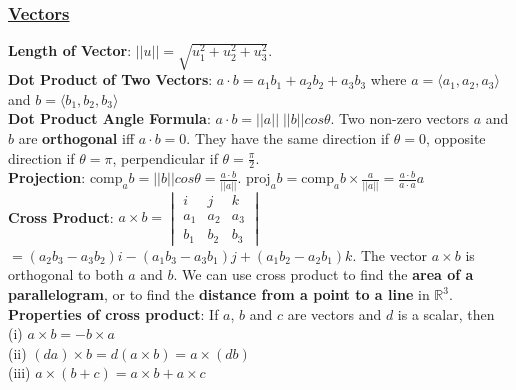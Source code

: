 \documentclass{article}
\begin{document}
\singlespacing

\titlespacing*{\subsubsection}{0pt}{0pt}{0pt}

\pagestyle{fancy}
\fancyhf{}
\renewcommand{\headrulewidth}{0pt}

\begin{multicols*}{3}

\subsubsection*{\underline{Vectors}}
\textbf{Length of Vector}: $||u||=\sqrt{u_1^2+u_2^2+u_3^2}$.\\
\textbf{Dot Product of Two Vectors}: $a\cdot b=a_1b_1 +a_2b_2 +a_3b_3$ where $a=\langle a_1,a_2,a_3\rangle$ and $b=\langle b_1,b_2,b_3\rangle$ \\
\textbf{Dot Product Angle Formula}: $a \cdot b = ||a|| \;||b|| cos \theta$. Two non-zero vectors $a$ and $b$ are \textbf{orthogonal} iff $a\cdot b=0$. They have the same direction if $\theta=0$, opposite direction if $\theta=\pi$, perpendicular if $\theta=\frac{\pi}{2}$. \\
\textbf{Projection}: $\text{comp}_ab=||b||cos\theta=\frac{a\cdot b}{||a||}$. $\text{proj}_ab=\text{comp}_ab\times \frac{a}{||a||}=\frac{a\cdot b}{a\cdot a}a$\\
\textbf{Cross Product}: $a\times b=\begin{vmatrix} i & j & k \\ a_1 & a_2 & a_3 \\ b_1 & b_2 & b_3 \end{vmatrix}$ $= (a_2b_3-a_3b_2)i - (a_1b_3-a_3b_1)j + (a_1b_2-a_2b_1)k$. The vector $a\times b$ is orthogonal to both $a$ and $b$. We can use cross product to find the \textbf{area of a parallelogram}, or to find the \textbf{distance from a point to a line} in $\mathbb{R}^3$. \\
\textbf{Properties of cross product}: If $a$, $b$ and $c$ are vectors and $d$ is a scalar, then \\ (i) $a\times b=-b\times a$\\
(ii) $(da)\times b=d(a\times b)=a\times(db)$\\
(iii) $a\times(b+c)=a\times b+a\times c$\\

\end{multicols*}
\end{document}
